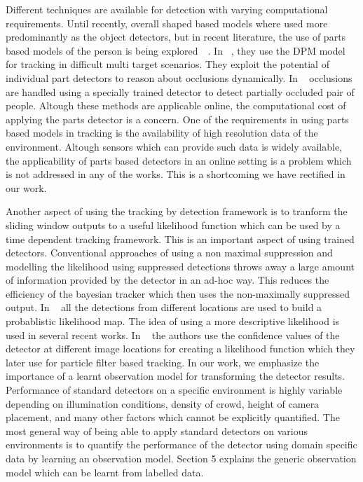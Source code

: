 \documentclass[10pt,twocolumn,letterpaper]{article}
\begin{document}
Different techniques are available for detection with varying computational requirements. Until recently, overall shaped based models where used more predominantly as the object detectors, but in recent literature, the use of parts based models of the person is being explored~\cite{doubleperson}~\cite{Parts_tracking1}.
In ~\cite{Parts_tracking1}, they use the DPM model for tracking in difficult multi target scenarios. They exploit the potential of individual part detectors to reason about occlusions dynamically. In ~\cite{doubleperson} occlusions are handled using a specially trained detector to detect partially occluded pair of people. 
Altough these methods are applicable online, the computational cost of applying the parts detector is a concern. One of the requirements in using parts based models in tracking is the availability of high resolution data of the environment. Altough sensors which can provide such data is widely available, the applicability of parts based detectors in an online setting is a problem which is not addressed in any of the works. This is a shortcoming we have rectified in our work. 

Another aspect of using the tracking by detection framework is to tranform the sliding window outputs to a useful likelihood function which can be used by a time dependent tracking framework. This is an important aspect of using trained detectors.  Conventional approaches of using a non maximal suppression and modelling the likelihood using suppressed detections throws away a large amount of information provided by the detector in an ad-hoc way. This reduces the efficiency of the bayesian tracker which then uses the non-maximally suppressed output. In ~\cite{POM-main} all the detections from different locations are used to build a probablistic likelihood map. The idea of using a more descriptive likelihood is used in several recent works. In ~\cite{Pami-11} the authors use the confidence values of the detector at different image locations for creating a likelihood function which they later use for particle filter based tracking. In our work, we emphasize the importance of a learnt observation model for transforming the detector results. Performance of standard detectors on a specific environment is highly variable depending on illumination conditions, density of crowd, height of camera placement, and many other factors which cannot be explicitly quantified. The most general way of being able to apply standard detectors on various environments is to quantify the performance of the detector using domain specific data by learning an observation model. Section 5 explains the generic observation model which can be learnt from labelled data.
\end{document}
